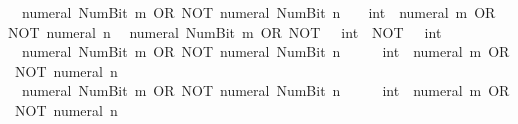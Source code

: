 \begin{isabellebody}
\ \ {\isacartoucheopen}numeral\ {\isacharparenleft}{\kern0pt}Num{\isachardot}{\kern0pt}Bit{}\ m{\isacharparenright}{\kern0pt}\ OR\ NOT\ {\isacharparenleft}{\kern0pt}numeral\ {\isacharparenleft}{\kern0pt}Num{\isachardot}{\kern0pt}Bit{}\ n{\isacharparenright}{\kern0pt}{\isacharparenright}{\kern0pt}\ {\isacharequal}{\kern0pt}\ {\isacharparenleft}{\kern0pt}{}\ {\isacharcolon}{\kern0pt}{\isacharcolon}{\kern0pt}\ int{\isacharparenright}{\kern0pt}\ {\isacharasterisk}{\kern0pt}\ {\isacharparenleft}{\kern0pt}numeral\ m\ OR\ NOT\ {\isacharparenleft}{\kern0pt}numeral\ n{\isacharparenright}{\kern0pt}{\isacharparenright}{\kern0pt}{\isacartoucheclose}\isanewline
\ \ {\isacartoucheopen}numeral\ {\isacharparenleft}{\kern0pt}Num{\isachardot}{\kern0pt}Bit{}\ m{\isacharparenright}{\kern0pt}\ OR\ NOT\ {\isacharparenleft}{\kern0pt}{}\ {\isacharcolon}{\kern0pt}{\isacharcolon}{\kern0pt}\ int{\isacharparenright}{\kern0pt}\ {\isacharequal}{\kern0pt}\ NOT\ {\isacharparenleft}{\kern0pt}{}\ {\isacharcolon}{\kern0pt}{\isacharcolon}{\kern0pt}\ int{\isacharparenright}{\kern0pt}{\isacartoucheclose}\isanewline
\ \ {\isacartoucheopen}numeral\ {\isacharparenleft}{\kern0pt}Num{\isachardot}{\kern0pt}Bit{}\ m{\isacharparenright}{\kern0pt}\ OR\ NOT\ {\isacharparenleft}{\kern0pt}numeral\ {\isacharparenleft}{\kern0pt}Num{\isachardot}{\kern0pt}Bit{}\ n{\isacharparenright}{\kern0pt}{\isacharparenright}{\kern0pt}\ {\isacharequal}{\kern0pt}\ {}\ {\isacharplus}{\kern0pt}\ {\isacharparenleft}{\kern0pt}{}\ {\isacharcolon}{\kern0pt}{\isacharcolon}{\kern0pt}\ int{\isacharparenright}{\kern0pt}\ {\isacharasterisk}{\kern0pt}\ {\isacharparenleft}{\kern0pt}numeral\ m\ OR\ NOT\ {\isacharparenleft}{\kern0pt}numeral\ n{\isacharparenright}{\kern0pt}{\isacharparenright}{\kern0pt}{\isacartoucheclose}\isanewline
\ \ {\isacartoucheopen}numeral\ {\isacharparenleft}{\kern0pt}Num{\isachardot}{\kern0pt}Bit{}\ m{\isacharparenright}{\kern0pt}\ OR\ NOT\ {\isacharparenleft}{\kern0pt}numeral\ {\isacharparenleft}{\kern0pt}Num{\isachardot}{\kern0pt}Bit{}\ n{\isacharparenright}{\kern0pt}{\isacharparenright}{\kern0pt}\ {\isacharequal}{\kern0pt}\ {}\ {\isacharplus}{\kern0pt}\ {\isacharparenleft}{\kern0pt}{}\ {\isacharcolon}{\kern0pt}{\isacharcolon}{\kern0pt}\ int{\isacharparenright}{\kern0pt}\ {\isacharasterisk}{\kern0pt}\ {\isacharparenleft}{\kern0pt}numeral\ m\ OR\ NOT\ {\isacharparenleft}{\kern0pt}numeral\ n{\isacharparenright}{\kern0pt}{\isacharparenright}{\kern0pt}{\isacartoucheclose}\isanewline

\end{isabellebody}

